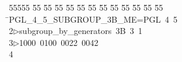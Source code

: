 %
%
\begin{tabbing}
55555 \= 55 \= 55 \= 55 \= 55 \= 55 \= 55 \= 55 \= 55 \= 55 \= 55 \= 55 \= 55 \= \>PGL\_4\_5\_SUBGROUP\_3B\_ME=PGL\ 4\ 5\ \\[0pt]
2\>$\triangleright$\>subgroup\_by\_generators\ 3B\ 3\ 1\ \\[0pt]
3\>$\triangleright$\>1000\ 0100\ 0022\ 0042\\[0pt]
4\>\end{tabbing}
